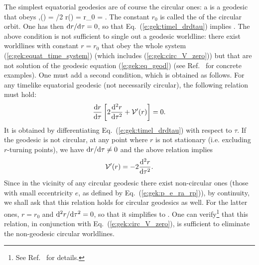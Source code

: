 The simplest equatorial geodesics are of course the circular ones:
a 
is a geodesic that obeys
\be
    \forall\tau\in{},\quad \theta(\tau) = \pi/2 \qand r(\tau) = r_0 =  .
\ee
The constant $r_0$ is called the  of the circular
orbit.
One has then $\mathrm{d} r/\mathrm{d}\tau = 0$, so that Eq.~(\ref{e:gek:timel_drdtau}) implies
\be \label{e:gek:circ_V_zero}
    .
\ee
The above condition is not sufficient to single out a geodesic worldline:
there exist worldlines with constant $r=r_0$ that obey the whole system
(\ref{e:gek:equat_time_system}) (which includes (\ref{e:gek:circ_V_zero}))
but that are not solution of the
geodesic equation (\ref{e:gek:eq_geod})
(see Ref.~\cite{Vanae20} for concrete examples). One must add a second condition, which
is obtained as follows. For any timelike equatorial geodesic (not necessarily
circular), the following relation must hold:
\[
    \frac{\mathrm{d} r}{\mathrm{d} \tau} \left[ 2 \frac{\mathrm{d}^2 r}{\mathrm{d} {\tau}^2} + \mathcal{V}'(r) \right] = 0 .
\]
It is obtained by differentiating Eq.~(\ref{e:gek:timel_drdtau}) with respect
to $\tau$. If the geodesic is not circular, at any point where $r$ is not
stationary (i.e. excluding $r$-turning points), we have $\mathrm{d} r/\mathrm{d}\tau \neq 0$
and the above relation implies
\[
    \mathcal{V}'(r) = - 2 \frac{\mathrm{d}^2 r}{\mathrm{d} {\tau}^2} .
\]
Since in the vicinity of any circular geodesic there exist non-circular ones
(those with small eccentricity $e$, as defined by Eq.~(\ref{e:gek:p_e_ra_rp})), by continuity, we shall ask that this relation
holds for circular geodesics as well. For the latter ones, $r=r_0$ and
$\mathrm{d}^2 r/\mathrm{d}\tau^2 = 0$, so that it simplifies to
\be \label{e:gek:circ_derV_zero}
    .
\ee
One can verify\footnote{See Ref.~\cite{Vanae20} for details.} that this
relation, in conjunction with Eq.~(\ref{e:gek:circ_V_zero}), is sufficient
to eliminate the non-geodesic circular worldlines.

